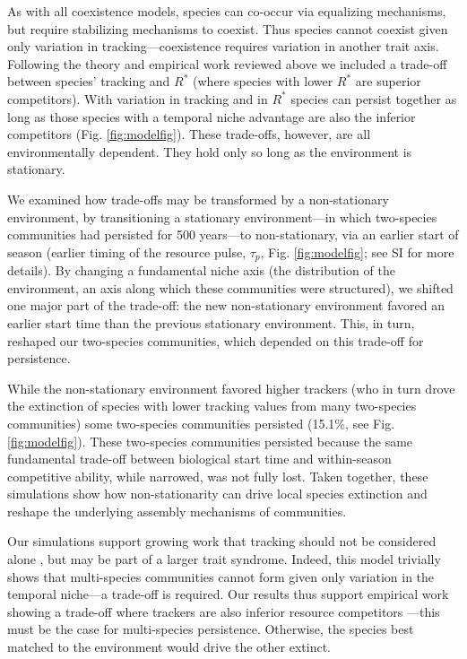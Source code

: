 \documentclass[11pt,letterpaper]{article}
\begin{document}
As with all coexistence models, species can co-occur via equalizing mechanisms, but require stabilizing mechanisms to coexist. Thus species cannot coexist given only variation in tracking---coexistence requires variation in another trait axis. Following the theory and empirical work reviewed above we included a trade-off between species' tracking and $R^*$ (where species with lower $R^*$ are superior competitors). With variation in tracking and in $R^*$ species can persist together as long as those species with a temporal niche advantage are also the inferior competitors (Fig. \ref{fig:modelfig}). These trade-offs, however, are all environmentally dependent. They hold only so long as the environment is stationary. %

We examined how trade-offs may be transformed by a non-stationary environment, by transitioning a stationary environment---in which two-species communities had persisted for 500 years---to non-stationary, via an earlier start of season (earlier timing of the resource pulse, $\tau_p$, Fig. \ref{fig:modelfig}; see SI for more details). By changing a fundamental niche axis (the distribution of the environment, an axis along which these communities were structured), we shifted one major part of the trade-off: the new non-stationary environment favored an earlier start time than the previous stationary environment. This, in turn, reshaped our two-species communities, which depended on this trade-off for persistence. 

While the non-stationary environment favored higher trackers (who in turn drove the extinction of species with lower tracking values from many two-species communities) some two-species communities persisted (15.1\%, see Fig. \ref{fig:modelfig}). These two-species communities persisted because the same fundamental trade-off between biological start time and within-season competitive ability, while narrowed, was not fully lost. Taken together, these simulations show how non-stationarity can drive local species extinction and reshape the underlying assembly mechanisms of communities.

Our simulations support growing work that tracking should not be considered alone \citep{Diamond:2011nx,Dorji2013,Ishioka2013,kharouba2014,du2017}, but may be part of a larger trait syndrome. Indeed, this model trivially shows that multi-species communities cannot form given only variation in the temporal niche---a trade-off is required. Our results thus support empirical work showing a trade-off where trackers are also inferior resource competitors \citep{lasky2016,Zhu2016BioLetters}---this must be the case for multi-species persistence. Otherwise, the species best matched to the environment would drive the other extinct.
\end{document}
